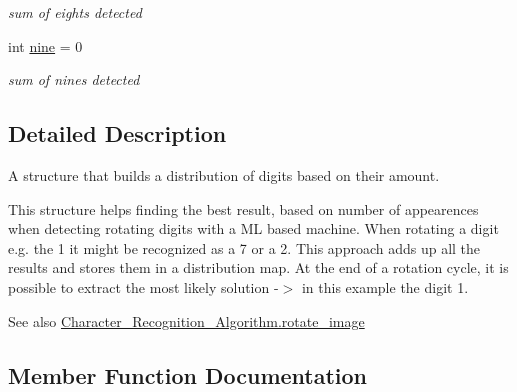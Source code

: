 \begin{DoxyCompactItemize}
\begin{DoxyCompactList}\small\item\em sum of eights detected \end{DoxyCompactList}\item 
\mbox{\label{struct_image_processing_1_1_digit_result_distribution_a72295947190d80311935d01a44aa2d22}} 
int \mbox{\hyperlink{struct_image_processing_1_1_digit_result_distribution_a72295947190d80311935d01a44aa2d22}{nine}} = 0
\begin{DoxyCompactList}\small\item\em sum of nines detected \end{DoxyCompactList}\end{DoxyCompactItemize}


\subsection{Detailed Description}
A structure that builds a distribution of digits based on their amount. 

This structure helps finding the best result, based on number of appearences when detecting rotating digits with a ML based machine. When rotating a digit e.\+g. the 1 it might be recognized as a 7 or a 2. This approach adds up all the results and stores them in a distribution map. At the end of a rotation cycle, it is possible to extract the most likely solution -\/$>$ in this example the digit 1.

\begin{DoxySeeAlso}{See also}
\mbox{\hyperlink{class_image_processing_1_1_character___recognition___algorithm_a08d3f01496729b439e68819e61a564e5}{Character\+\_\+\+Recognition\+\_\+\+Algorithm.\+rotate\+\_\+image}} 
\end{DoxySeeAlso}


\subsection{Member Function Documentation}
\mbox{\label{struct_image_processing_1_1_digit_result_distribution_a93d3216aa066401d9c1c0ed25bd618d6}} 
